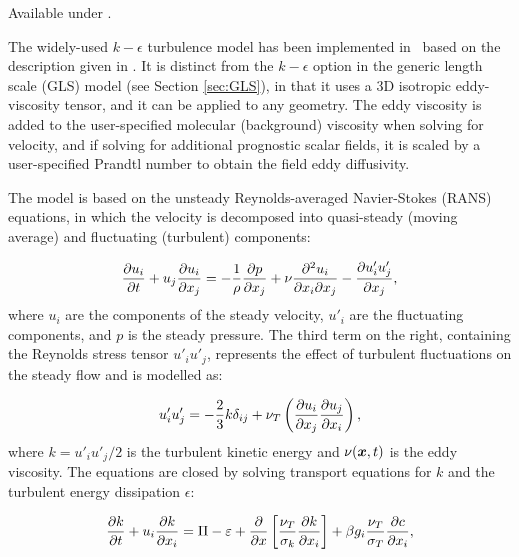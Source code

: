 Available under .

The widely-used $k-\epsilon$ turbulence model has been implemented in \fluidity\ based on the description given in
\citet{mathieu2000}. It is distinct from the $k-\epsilon$ option in the generic length scale (GLS) model (see
Section \ref{sec:GLS}), in that it uses a 3D isotropic eddy-viscosity tensor, and it can be applied to any geometry. The eddy viscosity is added to the user-specified molecular (background) viscosity when solving for velocity, and if solving for additional prognostic scalar fields, it is scaled by a user-specified Prandtl number to obtain the field eddy diffusivity.

The model is based on the unsteady Reynolds-averaged Navier-Stokes (RANS) equations, in which the velocity is decomposed into quasi-steady (moving average) and fluctuating (turbulent) components:

\begin{equation}\label{RANS}
\ppt[t]{u_i} + u_j \ppx[x_j]{u_i} = - \frac{1}{\rho } \ppx[x_j]{p} + \nu \frac{\partial^2 u_i}{\partial x_i \partial x_j} - \ppx[x_j]{u'_i u'_j},
\end{equation}
where $u_i$ are the components of the steady velocity, $u'_i$ are the fluctuating components, and $p$ is the steady pressure.
The third term on the right, containing the Reynolds stress tensor $u'_i u'_j$, represents the effect of turbulent fluctuations on the steady flow and is modelled as:

\begin{equation}\label{retens}
u'_i u'_j = - \frac 2 3 k \delta_{ij} + \nu_T \left (\ppx[x_j]{u_i} \ppx[x_i]{u_j} \right ),
\end{equation}
where $k=u'_i u'_j/2$ is the turbulent kinetic energy and $\nu(\bmx,t)$ is the eddy viscosity.
The equations are closed by solving transport equations for $k$ and the turbulent energy dissipation $\epsilon$:

\begin{equation}\label{k}
\ppt[t]{k} + u_i \ppx[x_i]{k} = \Pi - \epsilon + \ppx{} \left [ \frac{\nu_T}{\sigma_k} \ppx[x_i]{k} \right ] + \beta g_i \frac{\nu_T}{\sigma_T} \ppx[x_i]{c},
\end{equation}


